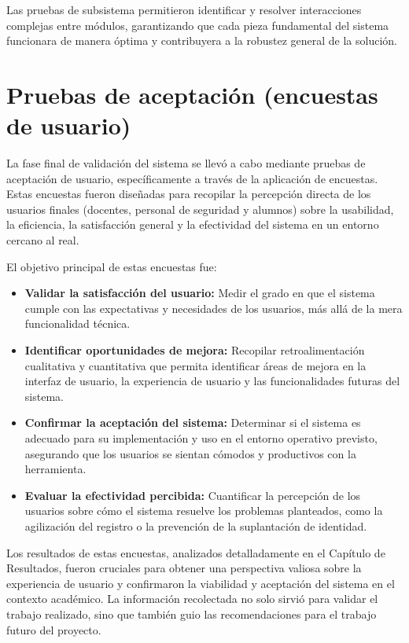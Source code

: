 Las pruebas de subsistema permitieron identificar y resolver interacciones complejas entre módulos, garantizando que cada pieza fundamental del sistema funcionara de manera óptima y contribuyera a la robustez general de la solución.

\section{Pruebas de aceptación (encuestas de usuario)}

La fase final de validación del sistema se llevó a cabo mediante pruebas de aceptación de usuario, específicamente a través de la aplicación de encuestas. Estas encuestas fueron diseñadas para recopilar la percepción directa de los usuarios finales (docentes, personal de seguridad y alumnos) sobre la usabilidad, la eficiencia, la satisfacción general y la efectividad del sistema en un entorno cercano al real.

El objetivo principal de estas encuestas fue:
\begin{itemize}
	\item \textbf{Validar la satisfacción del usuario:} Medir el grado en que el sistema cumple con las expectativas y necesidades de los usuarios, más allá de la mera funcionalidad técnica.
	\item \textbf{Identificar oportunidades de mejora:} Recopilar retroalimentación cualitativa y cuantitativa que permita identificar áreas de mejora en la interfaz de usuario, la experiencia de usuario y las funcionalidades futuras del sistema.
	\item \textbf{Confirmar la aceptación del sistema:} Determinar si el sistema es adecuado para su implementación y uso en el entorno operativo previsto, asegurando que los usuarios se sientan cómodos y productivos con la herramienta.
	\item \textbf{Evaluar la efectividad percibida:} Cuantificar la percepción de los usuarios sobre cómo el sistema resuelve los problemas planteados, como la agilización del registro o la prevención de la suplantación de identidad.
\end{itemize}

Los resultados de estas encuestas, analizados detalladamente en el Capítulo de Resultados, fueron cruciales para obtener una perspectiva valiosa sobre la experiencia de usuario y confirmaron la viabilidad y aceptación del sistema en el contexto académico. La información recolectada no solo sirvió para validar el trabajo realizado, sino que también guio las recomendaciones para el trabajo futuro del proyecto.



